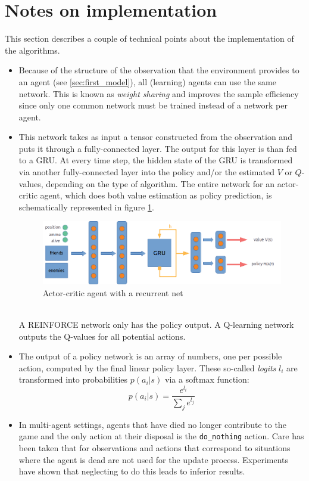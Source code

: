 \section{Notes on implementation}
This section describes a couple of technical points about the implementation of the algorithms.
\begin{itemize}
    \item Because of the structure of the observation that the environment provides to an agent (see \ref{sec:first_model}), all (learning) agents can use the same network. This is known as \emph{weight sharing} and improves the sample efficiency since only one common network must be trained instead of a network per agent.
    \item This network takes as input a tensor constructed from the observation and puts it through a fully-connected layer. The output for this layer is than fed to a GRU. At every time step, the hidden state of the GRU is transformed via another fully-connected layer into the policy and/or the estimated $V$ or $Q$-values, depending on the type of algorithm. The entire network for an actor-critic agent, which does both value estimation as policy prediction, is schematically represented in figure \ref{fig:agent_net}. 
    \begin{figure}[htp]
        \centering
        \includegraphics[width=14cm]{images/agent_net2.png}
        \caption{Actor-critic agent with a recurrent net}
        \label{fig:agent_net}
    \end{figure}
    \\A REINFORCE network only has the policy output. A Q-learning network outputs the Q-values for all potential actions.
    \item
        The output of a policy network is an array of numbers, one per possible action, computed by the final linear policy layer. These so-called \emph{logits} $l_i$ are transformed into probabilities $p(a_i | s)$ via a softmax function:
        \begin{equation}
            p(a_i | s) = \frac{e^{l_i}}{\sum_j e^{l_j}}
        \end{equation}
    \item In multi-agent settings, agents that have died no longer contribute to the game and the only action at their disposal is the {\tt do\_nothing} action. Care has been taken that for observations and actions that correspond to situations where the agent is dead are not used for the update process. Experiments have shown that neglecting to do this leads to inferior results.

\end{itemize}
